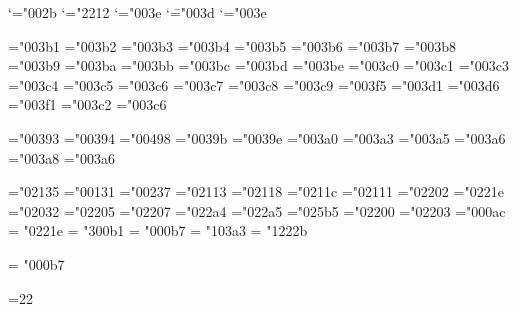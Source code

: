 \mathcode`\+="002b
\mathcode`\-="2212
\mathcode`\<="003e
\mathcode`\=="003d
\mathcode`\>="003e

\mathchardef\alpha="003b1
\mathchardef\beta="003b2
\mathchardef\gamma="003b3
\mathchardef\delta="003b4
\mathchardef\epsilon="003b5
\mathchardef\zeta="003b6
\mathchardef\eta="003b7
\mathchardef\theta="003b8
\mathchardef\iota="003b9
\mathchardef\kappa="003ba
\mathchardef\lambda="003bb
\mathchardef\mu="003bc
\mathchardef\nu="003bd
\mathchardef\xi="003be
\mathchardef\pi="003c0
\mathchardef\rho="003c1
\mathchardef\sigma="003c3
\mathchardef\tau="003c4
\mathchardef\upsilon="003c5
\mathchardef\phi="003c6
\mathchardef\chi="003c7
\mathchardef\psi="003c8
\mathchardef\omega="003c9
\mathchardef\varepsilon="003f5
\mathchardef\vartheta="003d1
\mathchardef\varpi="003d6
\mathchardef\varrho="003f1
\mathchardef\varsigma="003c2
\mathchardef\varphi="003c6

\mathchardef\Gamma="00393
\mathchardef\Delta="00394
\mathchardef\Theta="00498
\mathchardef\Lambda="0039b
\mathchardef\Xi="0039e
\mathchardef\Pi="003a0
\mathchardef\Sigma="003a3
\mathchardef\Upsilon="003a5
\mathchardef\Phi="003a6
\mathchardef\Psi="003a8
\mathchardef\Omega="003a6

\mathchardef\aleph="02135
\mathchardef\imath="00131
\mathchardef\jmath="00237
\mathchardef\ell="02113
\mathchardef\wp="02118
\mathchardef\Re="0211c
\mathchardef\Im="02111
\mathchardef\partial="02202
\mathchardef\infty="0221e
\mathchardef\prime="02032
\mathchardef\emptyset="02205
\mathchardef\nabla="02207
\mathchardef\top="022a4
\mathchardef\bot="022a5
\mathchardef\triangle="025b5
\mathchardef\forall="02200
\mathchardef\exists="02203
\mathchardef\neg="000ac \let\lnot=\neg
\mathchardef\infty = "0221e
\mathchardef\plusminus = "300b1
\mathchardef\cdotp = "000b7
\mathchardef\sum   = "103a3
\mathchardef\intop = "1222b

\def\int{\intop\nolimits}
\def\sqrt{\radical"2221a}
\mathchardef\cdotp = "000b7
\def\cdots{%
  \mathinner{\cdotp\cdotp\cdotp}}

=22
\countdef{}\countdef{}
\def\newcount{\alloc0\count\countdef\inscount}
\def\alloc#1#2#3#4#5{\global\advance\count1#1 by1
  \allocationnumber=\count1#1
  \global#3#5=\allocationnumber}
